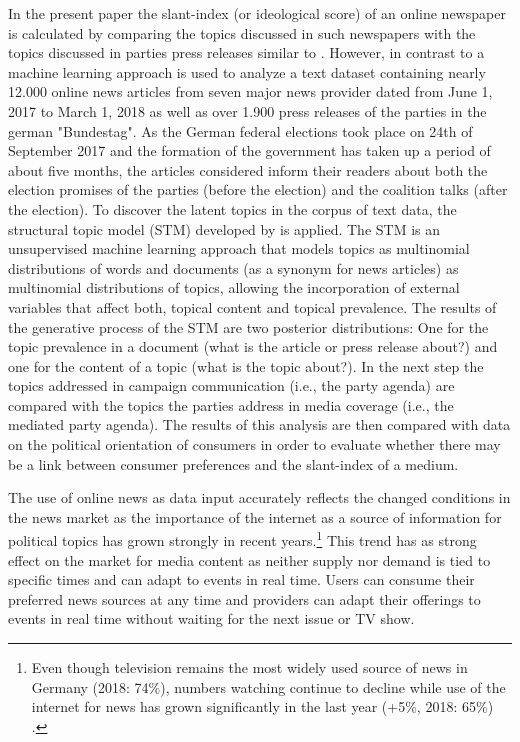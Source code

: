 \documentclass[12pt,a4paper,notitlepage]{article}
\begin{document}
In the present paper the slant-index (or ideological score) of an online newspaper is calculated by comparing the topics discussed in such newspapers with the topics discussed in parties press releases similar to \citet{eberl_one_2017}. However, in contrast to \citet{eberl_one_2017} a machine learning approach is used to analyze a text dataset containing nearly 12.000 online news articles from seven major news provider dated from June 1, 2017 to March 1, 2018 as well as over 1.900 press releases of the parties in the german "Bundestag". As the German federal elections took place on 24th of September 2017 and the formation of the government has taken up a period of about five months, the articles considered inform their readers about both the election promises of the parties (before the election) and the coalition talks (after the election). To discover the latent topics in the corpus of text data, the structural topic model (STM) developed by \citet{roberts_model_2016} is applied. The STM is an unsupervised machine learning approach that models topics as multinomial distributions of words and documents (as a synonym for news articles) as multinomial distributions of topics, allowing the incorporation of external variables that affect both, topical content and topical prevalence. The results of the generative process of the STM are two posterior distributions: One for the topic prevalence in a document (what is the article or press release about?) and one for the content of a topic (what is the topic about?). In the next step the topics addressed in campaign communication (i.e., the party agenda) are compared with the topics the parties address in media coverage (i.e., the mediated party agenda). The results of this analysis are then compared with data on the political orientation of consumers in order to evaluate whether there may be a link between consumer preferences and the slant-index of a medium. 

The use of online news as data input accurately reflects the changed conditions in the news market as the importance of the internet as a source of information for political topics has grown strongly in recent years.\footnote{Even though television remains the most widely used source of news in Germany (2018: 74\%), numbers watching continue to decline while use of the internet for news has grown significantly in the last year (+5\%, 2018: 65\%) \citep{holig_reuters_2018}.} This trend has as strong effect on the market for media content as neither supply nor demand is tied to specific times and can adapt to events in real time. Users can consume their preferred news sources at any time and providers can adapt their offerings to events in real time without waiting for the next issue or TV show.
\end{document}

